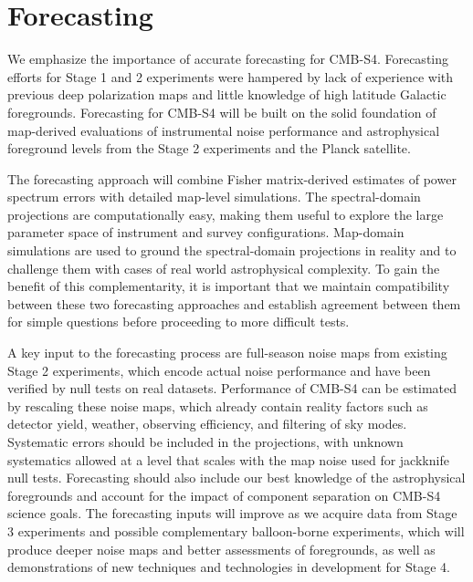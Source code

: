 
\section{Forecasting}\label{sec:Forecasting}

We emphasize the importance of accurate forecasting for CMB-S4.
Forecasting efforts for Stage 1 and 2 experiments were hampered by lack of experience with previous deep polarization maps and little knowledge of high latitude Galactic foregrounds.
Forecasting for CMB-S4 will be built on the solid foundation of map-derived evaluations of instrumental noise performance and astrophysical foreground levels from the Stage 2 experiments and the Planck satellite.

The forecasting approach will combine Fisher matrix-derived estimates of power spectrum errors with detailed map-level simulations.
The spectral-domain projections are computationally easy, making them useful to explore the large parameter space of instrument and survey configurations.
Map-domain simulations are used to ground the spectral-domain projections in reality and to challenge them with cases of real world astrophysical complexity.
To gain the benefit of this complementarity, it is important that we maintain compatibility between these two forecasting approaches and establish agreement between them for simple questions before proceeding to more difficult tests.

A key input to the forecasting process are full-season noise maps from existing Stage 2 experiments, which encode actual noise performance and have been verified by null tests on real datasets.
Performance of CMB-S4 can be estimated by rescaling these noise maps, which already contain reality factors such as detector yield, weather, observing efficiency, and filtering of sky modes.
Systematic errors should be included in the projections, with unknown systematics allowed at a level that scales with the map noise used for jackknife null tests.
Forecasting should also include our best knowledge of the astrophysical foregrounds and account for the impact of component separation on CMB-S4 science goals.
The forecasting inputs will improve as we acquire data from Stage 3 experiments and possible complementary balloon-borne experiments, which will produce deeper noise maps and better assessments of foregrounds, as well as demonstrations of new techniques and technologies in development for Stage 4.


